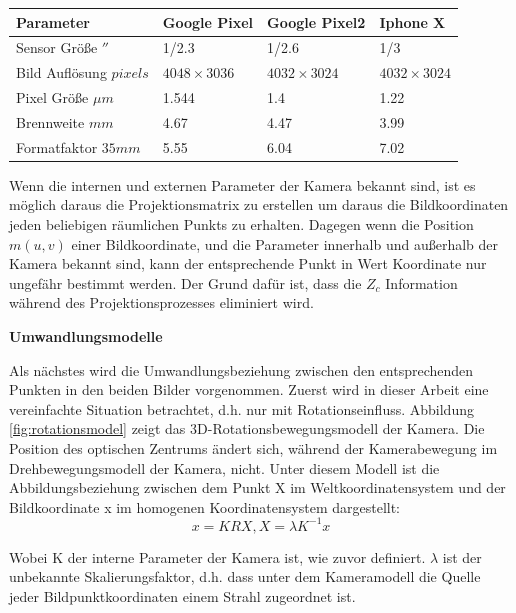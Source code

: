 \begin{table}[htb]
	\label{tbl:params}
	\footnotesize
	\centering
	\begin{tabular}{|p{3cm}|p{2.5cm}|p{2.5cm}|p{2.5cm}|}	%
	\toprule
	\textbf{Parameter} & \textbf{Google Pixel} & \textbf{Google Pixel2} & \textbf{Iphone X}\\
	\midrule
	Sensor Größe $''$ & 1/2.3 & 1/2.6 & 1/3 \\
	Bild Auflösung $pixels$ & $4048 \times 3036$ & $4032 \times 3024$ & $4032 \times 3024$ \\
	Pixel Größe $\mu m$ & 1.544 & 1.4 & 1.22 \\	
	Brennweite $mm$ & 4.67 & 4.47 & 3.99 \\
	Formatfaktor $35 mm$  	&5.55	&6.04	&7.02	\\
	
	\bottomrule
	\end{tabular}
\end{table} 


Wenn die internen und externen Parameter der Kamera bekannt sind, ist es möglich daraus die Projektionsmatrix zu erstellen um daraus die Bildkoordinaten jeden beliebigen räumlichen Punkts zu erhalten. Dagegen wenn die Position $m(u,v)$ einer Bildkoordinate, und die Parameter innerhalb und außerhalb der Kamera bekannt sind, kann der entsprechende Punkt in Wert Koordinate nur ungefähr bestimmt werden. Der Grund dafür ist, dass die $Z_c$ Information während des Projektionsprozesses eliminiert wird. 

\textbf{Umwandlungsmodelle}

Als nächstes wird die Umwandlungsbeziehung zwischen den entsprechenden Punkten in den beiden Bilder vorgenommen. Zuerst wird in dieser Arbeit eine vereinfachte Situation betrachtet, d.h. nur mit Rotationseinfluss. Abbildung \ref{fig:rotationsmodel} zeigt das 3D-Rotationsbewegungsmodell der Kamera. Die Position des optischen Zentrums ändert sich, während der Kamerabewegung im Drehbewegungsmodell der Kamera, nicht. Unter diesem Modell ist die Abbildungsbeziehung zwischen dem Punkt X im Weltkoordinatensystem und der Bildkoordinate x im homogenen Koordinatensystem dargestellt: 
\begin{equation}
   x = KRX, X = \lambda  K^{-1} x
\end{equation}

Wobei K der interne Parameter der Kamera ist, wie zuvor definiert. $\lambda$ ist der unbekannte Skalierungsfaktor, d.h. dass unter dem Kameramodell die Quelle jeder Bildpunktkoordinaten einem Strahl zugeordnet ist.

